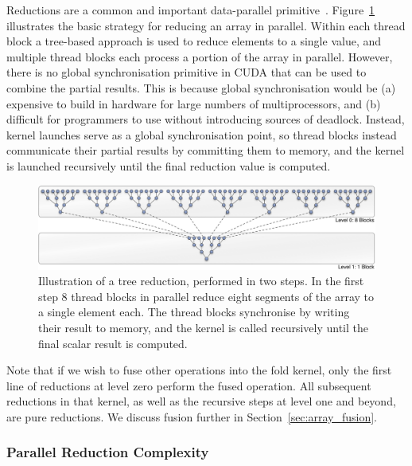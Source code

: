 Reductions are a common and important data-parallel
primitive~\cite{Chatterjee:2009vh}. Figure~\ref{fig:tree_reduction} illustrates
the basic strategy for reducing an array in parallel. Within each thread block a
tree-based approach is used to reduce elements to a single value, and multiple
thread blocks each process a portion of the array in parallel. However, there is
no global synchronisation primitive in CUDA that can be used to combine the
partial results. This is because global synchronisation would be (a) expensive
to build in hardware for large numbers of multiprocessors, and (b) difficult for
programmers to use without introducing sources of deadlock. Instead, kernel
launches serve as a global synchronisation point, so thread blocks instead
communicate their partial results by committing them to memory, and the kernel
is launched recursively until the final reduction value is computed.

\begin{figure}
    \begin{center}
        \includegraphics[width=\textwidth]{images/basics/tree-reduction}
    \end{center}
    \caption[A parallel tree reduction]{Illustration of a tree reduction,
        performed in two steps. In the first step 8 thread blocks in parallel
        reduce eight segments of the array to a single element each. The thread
        blocks synchronise by writing their result to memory, and the kernel is
        called recursively until the final scalar result is computed.}
    \label{fig:tree_reduction}
\end{figure}

Note that if we wish to fuse\fusion{} other operations into the fold kernel,
only the first line of reductions at level zero perform the fused operation. All
subsequent reductions in that kernel, as well as the recursive steps at level
one and beyond, are pure reductions. We discuss fusion further in
Section~\ref{sec:array_fusion}.

\subsubsection{Parallel Reduction Complexity}
\label{sec:parallel_reduction_complexity}

